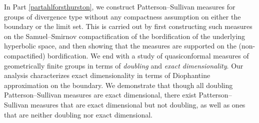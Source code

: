 \documentclass{surv-l}
\numberwithin{equation}{section}
\numberwithin{figure}{section}%
\theoremstyle{theorem}
\theoremstyle{definition}
\begin{document}
\begin{Abstract}
In Part \ref{partahlforsthurston}, we construct Patterson--Sullivan measures for groups of divergence type without any compactness assumption on either the boundary or the limit set. This is carried out by first constructing such measures on the Samuel--Smirnov compactification of the bordification of the underlying hyperbolic space, and then showing that the measures are supported on the (non-compactified) bordification. 
We end with a study of quasiconformal measures of geometrically finite groups in terms of \emph{doubling} and \emph{exact dimensionality}. Our analysis characterizes exact dimensionality in terms of Diophantine approximation on the boundary. We demonstrate that though all doubling Patterson--Sullivan measures are exact dimensional, there exist Patterson--Sullivan measures that are exact dimensional but not doubling, as well as ones that are neither doubling nor exact dimensional.
%
%
%
\end{Abstract}
\maketitle
\end{document}
